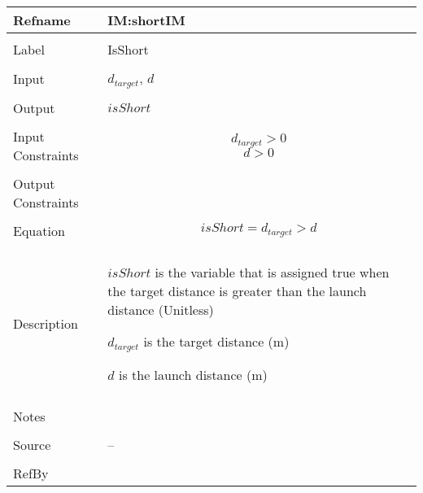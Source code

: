 \documentclass[12pt]{article}
\begin{document}
\noindent \begin{minipage}{\textwidth}
\begin{tabular}{p{} p{}}
\toprule \textbf{Refname} & \textbf{IM:shortIM}
\label{IM:shortIM}
\\ \midrule \\
Label & IsShort
\\ \midrule \\
Input & ${d_{target}}$, $d$
\\ \midrule \\
Output & $isShort$
\\ \midrule \\
Input Constraints & \begin{displaymath}
                    {d_{target}}>0
                    \end{displaymath}
                    \begin{displaymath}
                    d>0
                    \end{displaymath}
\\ \midrule \\
Output Constraints & 
\\ \midrule \\
Equation & \begin{displaymath}
           isShort={d_{target}}>d
           \end{displaymath}
\\ \midrule \\
Description & \begin{symbDescription}
              \item{$isShort$ is the variable that is assigned true when the target distance is greater than the launch distance (Unitless)}
              \item{${d_{target}}$ is the target distance (m)}
              \item{$d$ is the launch distance (m)}
              \end{symbDescription}
\\ \midrule \\
Notes & 
\\ \midrule \\
Source & --
\\ \midrule \\
RefBy & 
\\ \bottomrule \end{tabular}
\end{minipage}
\par~
\end{document}
